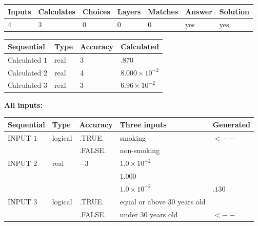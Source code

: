 \documentclass[12pt]{article}
\begin{document}
 

 
\vspace{0.3in}
   
   
   
   
\noindent\begin{tabular}{|l|l|l|l|l|l|l|}
 \hline
Inputs & Calculates & Choices & Layers & Matches & Answer & Solution \\ \hline
           4 & 
           3 & 
           0
  & 
           0 & 
           0 & 
  yes & 
  yes 
  \\ \hline
 \end{tabular}
   
   
   
   
\noindent{}
   
   
  
  
\noindent\begin{tabular}{|l|l|l|l|}
\hline
 Sequential & Type & Accuracy & Calculated \\ 
\hline
 
 
  Calculated $           1$ & real & $           3 $ & 
 $ .870 $ 
 \\  \hline  
 
 
  Calculated $           2$ & real & $           4 $ & 
 $ 8.000 \times 10^{-2} $ 
 \\  \hline  
 
 
  Calculated $           3$ & real & $           3 $ & 
 $ 6.96 \times 10^{-2} $ 
 \\  \hline  
 \end{tabular}
   
   
   
   
\noindent\vspace{0.1in}\hspace{-0.08in} {\textbf{\Large{All inputs: }}}
   
   
  
  
\noindent\begin{tabular}{|l|l|l|l|l|}
\hline
 Sequential & Type & Accuracy & Three inputs & Generated \\ 
\hline
 
 
  INPUT $           1$ & logical & .TRUE. & 
 smoking & 
  $ <-- $ 
  \\
  & & .FALSE. & 
  non-smoking & 
 \\  \hline  
 
 
  INPUT $           2$ & real & $          -3 $ & $
 1.0 \times 10^{-2}
  $ & \\
  & & &  $
 1.000
  $ & \\
  & & &  $
 1.0 \times 10^{-2}
 $ & $ .130 $ 
 \\  \hline  
 
 
  INPUT $           3$ & logical & .TRUE. & 
 equal or above 30 years old & 
  \\
  & & .FALSE. & 
  under 30 years old & 
  $ <-- $ 
 \\  \hline  
 \end{tabular}
   
\end{document}
